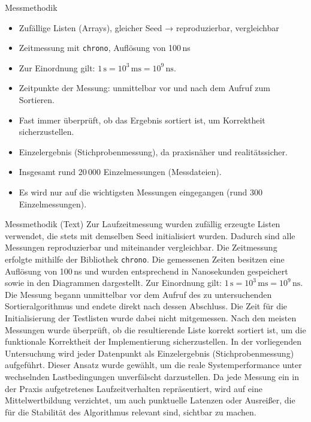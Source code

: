 \documentclass[10pt, ngerman]{beamer}
\begin{document}
\begin{frame}{Messmethodik}
    \begin{itemize}
        \item Zufällige Listen (Arrays), gleicher Seed → reproduzierbar, vergleichbar
        \item Zeitmessung mit \texttt{chrono}, Auflösung von 100\,ns
        \item Zur Einordnung gilt: \(1\,\text{s} = 10^3\,\text{ms} = 10^9\,\text{ns}\).
        \item Zeitpunkte der Messung: unmittelbar vor und nach dem Aufruf zum Sortieren.
        \item Fast immer überprüft, ob das Ergebnis sortiert ist, um Korrektheit sicherzustellen.
        \item Einzelergebnis (Stichprobenmessung), da praxisnäher und realitätssicher.
        \item Insgesamt rund 20\,000 Einzelmessungen (Messdateien).
        \item Es wird nur auf die wichtigsten Messungen eingegangen (rund 300 Einzelmessungen).
    \end{itemize}
\end{frame}

\begin{frame}{Messmethodik (Text)}
    Zur Laufzeitmessung wurden zufällig erzeugte Listen verwendet, die stets mit demselben Seed initialisiert wurden. Dadurch sind alle Messungen reproduzierbar und miteinander vergleichbar.
    \newline
    Die Zeitmessung erfolgte mithilfe der Bibliothek \texttt{chrono}. Die gemessenen Zeiten besitzen eine Auflösung von 100\,ns und wurden entsprechend in Nanosekunden gespeichert sowie in den Diagrammen dargestellt. Zur Einordnung gilt:
    \(1\,\text{s} = 10^3\,\text{ms} = 10^9\,\text{ns}\).
    \newline
    Die Messung begann unmittelbar vor dem Aufruf des zu untersuchenden Sortieralgorithmus und endete direkt nach dessen Abschluss. Die Zeit für die Initialisierung der Testlisten wurde dabei nicht mitgemessen.
    \newline
    Nach den meisten Messungen wurde überprüft, ob die resultierende Liste korrekt sortiert ist, um die funktionale Korrektheit der Implementierung sicherzustellen.
    \newline
    In der vorliegenden Untersuchung wird jeder Datenpunkt als Einzelergebnis (Stichprobenmessung) aufgeführt. Dieser Ansatz wurde gewählt, um die reale Systemperformance unter wechselnden Lastbedingungen unverfälscht darzustellen. Da jede Messung ein in der Praxis aufgetretenes Laufzeitverhalten repräsentiert, wird auf eine Mittelwertbildung verzichtet, um auch punktuelle Latenzen oder Ausreißer, die für die Stabilität des Algorithmus relevant sind, sichtbar zu machen.
\end{frame}
\end{document}
